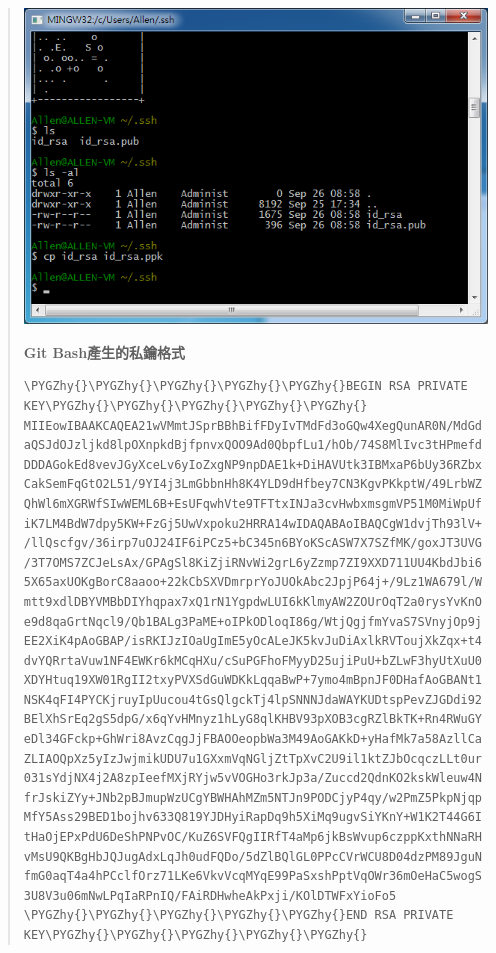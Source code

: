 \documentclass[letterpaper,10pt,english]{sphinxmanual}
\def\PYGZhy{\char`\-}
\begin{document}
\begin{quote}

\includegraphics{openssh-putty-002.png}

\textbf{Git Bash產生的私鑰格式}

\begin{Verbatim}[commandchars=\\\{\}]
\PYGZhy{}\PYGZhy{}\PYGZhy{}\PYGZhy{}\PYGZhy{}BEGIN RSA PRIVATE KEY\PYGZhy{}\PYGZhy{}\PYGZhy{}\PYGZhy{}\PYGZhy{}
MIIEowIBAAKCAQEA21wVMmtJSprBBhBifFDyIvTMdFd3oGQw4XegQunAR0N/MdGd
aQSJdOJzljkd8lpOXnpkdBjfpnvxQOO9Ad0QbpfLu1/hOb/74S8MlIvc3tHPmefd
DDDAGokEd8vevJGyXceLv6yIoZxgNP9npDAE1k+DiHAVUtk3IBMxaP6bUy36RZbx
CakSemFqGtO2L51/9YI4j3LmGbbnHh8K4YLD9dHfbey7CN3KgvPKkptW/49LrbWZ
QhWl6mXGRWfSIwWEML6B+EsUFqwhVte9TFTtxINJa3cvHwbxmsgmVP51M0MiWpUf
iK7LM4BdW7dpy5KW+FzGj5UwVxpoku2HRRA14wIDAQABAoIBAQCgW1dvjTh93lV+
/llQscfgv/36irp7uOJ24IF6iPCz5+bC345n6BYoKScASW7X7SZfMK/goxJT3UVG
/3T7OMS7ZCJeLsAx/GPAgSl8KiZjiRNvWi2grL6yZzmp7ZI9XXD711UU4KbdJbi6
5X65axUOKgBorC8aaoo+22kCbSXVDmrprYoJUOkAbc2JpjP64j+/9Lz1WA679l/W
mtt9xdlDBYVMBbDIYhqpax7xQ1rN1YgpdwLUI6kKlmyAW2ZOUrOqT2a0rysYvKnO
e9d8qaGrtNqcl9/Qb1BALg3PaME+oIPkODloqI86g/WtjQgjfmYvaS7SVnyjOp9j
EE2XiK4pAoGBAP/isRKIJzIOaUgImE5yOcALeJK5kvJuDiAxlkRVToujXkZqx+t4
dvYQRrtaVuw1NF4EWKr6kMCqHXu/cSuPGFhoFMyyD25ujiPuU+bZLwF3hyUtXuU0
XDYHtuq19XW01RgII2txyPVXSdGuWDKkLqqaBwP+7ymo4mBpnJF0DHafAoGBANt1
NSK4qFI4PYCKjruyIpUucou4tGsQlgckTj4lpSNNNJdaWAYKUDtspPevZJGDdi92
BElXhSrEq2gS5dpG/x6qYvHMnyz1hLyG8qlKHBV93pXOB3cgRZlBkTK+Rn4RWuGY
eDl34GFckp+GhWri8AvzCqgJjFBAOOeopbWa3M49AoGAKkD+yHafMk7a58AzllCa
ZLIAOQpXz5yIzJwjmikUDU7u1GXxmVqNGljZtTpXvC2U9il1ktZJbOcqczLLt0ur
031sYdjNX4j2A8zpIeefMXjRYjw5vVOGHo3rkJp3a/Zuccd2QdnKO2kskWleuw4N
frJskiZYy+JNb2pBJmupWzUCgYBWHAhMZm5NTJn9PODCjyP4qy/w2PmZ5PkpNjqp
MfY5Ass29BED1bojhv633Q819YJDHyiRapDq9h5XiMq9ugvSiYKnY+W1K2T44G6I
tHaOjEPxPdU6DeShPNPvOC/KuZ6SVFQgIIRfT4aMp6jkBsWvup6czppKxthNNaRH
vMsU9QKBgHbJQJugAdxLqJh0udFQDo/5dZlBQlGL0PPcCVrWCU8D04dzPM89JguN
fmG0aqT4a4hPCclfOrz71LKe6VkvVcqMYqE99PaSxshPptVqOWr36mOeHaC5wogS
3U8V3u06mNwLPqIaRPnIQ/FAiRDHwheAkPxji/KOlDTWFxYioFo5
\PYGZhy{}\PYGZhy{}\PYGZhy{}\PYGZhy{}\PYGZhy{}END RSA PRIVATE KEY\PYGZhy{}\PYGZhy{}\PYGZhy{}\PYGZhy{}\PYGZhy{}
\end{Verbatim}


\end{quote}
\end{document}
